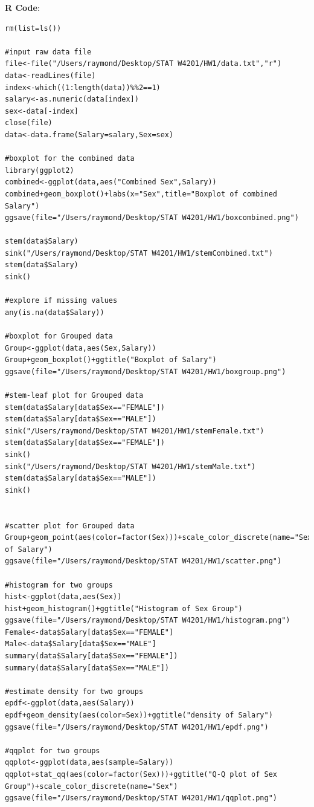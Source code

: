 \documentclass[10pt,letterpaper]{article}
\begin{document}
\newpage
\textbf{R Code}:
\begin{lstlisting}
rm(list=ls())

#input raw data file
file<-file("/Users/raymond/Desktop/STAT W4201/HW1/data.txt","r")
data<-readLines(file)
index<-which((1:length(data))%%2==1)
salary<-as.numeric(data[index])
sex<-data[-index]
close(file)
data<-data.frame(Salary=salary,Sex=sex)

#boxplot for the combined data
library(ggplot2)
combined<-ggplot(data,aes("Combined Sex",Salary))
combined+geom_boxplot()+labs(x="Sex",title="Boxplot of combined Salary")
ggsave(file="/Users/raymond/Desktop/STAT W4201/HW1/boxcombined.png")

stem(data$Salary)
sink("/Users/raymond/Desktop/STAT W4201/HW1/stemCombined.txt")
stem(data$Salary)
sink()

#explore if missing values
any(is.na(data$Salary))

#boxplot for Grouped data
Group<-ggplot(data,aes(Sex,Salary))
Group+geom_boxplot()+ggtitle("Boxplot of Salary")
ggsave(file="/Users/raymond/Desktop/STAT W4201/HW1/boxgroup.png")

#stem-leaf plot for Grouped data
stem(data$Salary[data$Sex=="FEMALE"])
stem(data$Salary[data$Sex=="MALE"])
sink("/Users/raymond/Desktop/STAT W4201/HW1/stemFemale.txt")
stem(data$Salary[data$Sex=="FEMALE"])
sink()
sink("/Users/raymond/Desktop/STAT W4201/HW1/stemMale.txt")
stem(data$Salary[data$Sex=="MALE"])
sink()


#scatter plot for Grouped data
Group+geom_point(aes(color=factor(Sex)))+scale_color_discrete(name="Sex")+ggtitle("Scatter of Salary")
ggsave(file="/Users/raymond/Desktop/STAT W4201/HW1/scatter.png")

#histogram for two groups
hist<-ggplot(data,aes(Sex))
hist+geom_histogram()+ggtitle("Histogram of Sex Group")
ggsave(file="/Users/raymond/Desktop/STAT W4201/HW1/histogram.png")
Female<-data$Salary[data$Sex=="FEMALE"]
Male<-data$Salary[data$Sex=="MALE"]
summary(data$Salary[data$Sex=="FEMALE"])
summary(data$Salary[data$Sex=="MALE"])

#estimate density for two groups
epdf<-ggplot(data,aes(Salary))
epdf+geom_density(aes(color=Sex))+ggtitle("density of Salary")
ggsave(file="/Users/raymond/Desktop/STAT W4201/HW1/epdf.png")

#qqplot for two groups
qqplot<-ggplot(data,aes(sample=Salary))
qqplot+stat_qq(aes(color=factor(Sex)))+ggtitle("Q-Q plot of Sex Group")+scale_color_discrete(name="Sex")
ggsave(file="/Users/raymond/Desktop/STAT W4201/HW1/qqplot.png")


\end{lstlisting}
\end{document}

